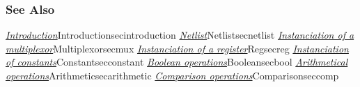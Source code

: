 \subsubsection{See Also}

\hyperref[ref]{\emph{Introduction}}{}{Introduction}{secintroduction}
\hyperref[ref]{\emph{Netlist}}{}{Netlist}{secnetlist}
\hyperref[ref]{\emph{Instanciation of a multiplexor}}{}{Multiplexor}{secmux}
\hyperref[ref]{\emph{Instanciation of a register}}{}{Reg}{secreg}
\hyperref[ref]{\emph{Instanciation of constants}}{}{Constant}{secconstant}
\hyperref[ref]{\emph{Boolean operations}}{}{Boolean}{secbool}
\hyperref[ref]{\emph{Arithmetical operations}}{}{Arithmetic}{secarithmetic}
\hyperref[ref]{\emph{Comparison operations}}{}{Comparison}{seccomp}
